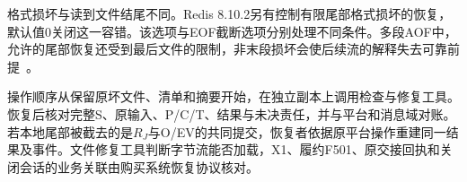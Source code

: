 格式损坏与读到文件结尾不同。Redis 8.10.2另有控制有限尾部格式损坏的恢复，默认值0关闭这一容错。该选项与EOF截断选项分别处理不同条件。多段AOF中，允许的尾部恢复还受到最后文件的限制，非末段损坏会使后续流的解释失去可靠前提~\cite{redis8102-source}。

操作顺序从保留原坏文件、清单和摘要开始，在独立副本上调用检查与修复工具。恢复后核对完整S、原输入、P/C/T、结果与未决责任，并与平台和消息域对账。若本地尾部被截去的是$R_J$与O/EV的共同提交，恢复者依据原平台操作重建同一结果及事件。文件修复工具判断字节流能否加载，X1、履约F501、原交接回执和关闭会话的业务关联由购买系统恢复协议核对。
\FloatBarrier
